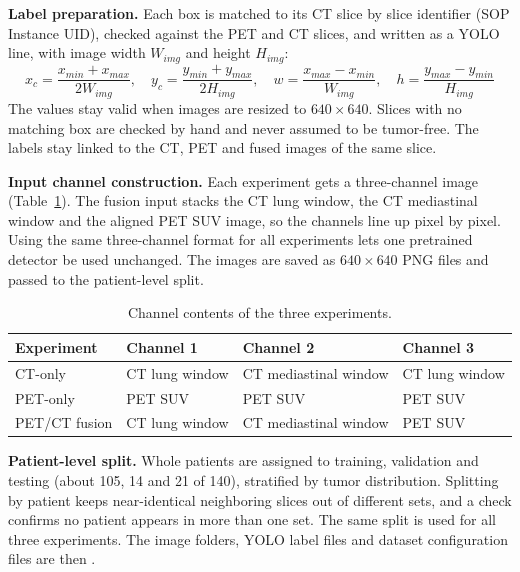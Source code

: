 \textbf{Label preparation.} Each box is matched to its CT slice by slice identifier (SOP Instance UID), checked against the PET and CT slices, and written as a YOLO line, with image width $W_{img}$ and height $H_{img}$:
\begin{equation}
	x_c = \frac{x_{min} + x_{max}}{2W_{img}}, \quad
	y_c = \frac{y_{min} + y_{max}}{2H_{img}}, \quad
	w = \frac{x_{max} - x_{min}}{W_{img}}, \quad
	h = \frac{y_{max} - y_{min}}{H_{img}}
\end{equation}
The values stay valid when images are resized to $640 \times 640$. Slices with no matching box are checked by hand and never assumed to be tumor-free. The labels stay linked to the CT, PET and fused images of the same slice.

\textbf{Input channel construction.} Each experiment gets a three-channel image (Table~\ref{tab:channels}). The fusion input stacks the CT lung window, the CT mediastinal window and the aligned PET SUV image, so the channels line up pixel by pixel. Using the same three-channel format for all experiments lets one pretrained detector be used unchanged. The images are saved as $640 \times 640$ PNG files and passed to the patient-level split.

\begin{table}[htbp]
	\centering
	\caption{Channel contents of the three experiments.}
	\label{tab:channels}
	\begin{tabular}{llll}
		\hline
		Experiment & Channel 1 & Channel 2 & Channel 3 \\
		\hline
		CT-only & CT lung window & CT mediastinal window & CT lung window \\
		PET-only & PET SUV & PET SUV & PET SUV \\
		PET/CT fusion & CT lung window & CT mediastinal window & PET SUV \\
		\hline
	\end{tabular}
\end{table}

\textbf{Patient-level split.} Whole patients are assigned to training, validation and testing (about 105, 14 and 21 of 140), stratified by tumor distribution. Splitting by patient keeps near-identical neighboring slices out of different sets, and a check confirms no patient appears in more than one set. The same split is used for all three experiments. The image folders, YOLO label files and dataset configuration files are then .

